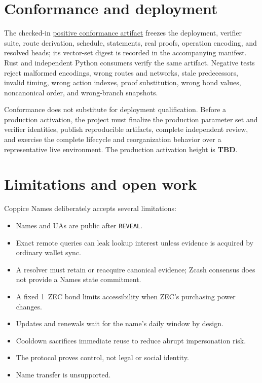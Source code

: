 \documentclass[11pt]{article}
\newcommand{\operation}[1]{\texttt{#1}}
\newcommand{\statusword}[1]{\textbf{#1}}
\begin{document}
\section{Conformance and deployment}
\label{sec:conformance}

The checked-in
\href{https://github.com/nfl0/coppice-names/blob/main/test-vectors/protocol.json}{positive
conformance artifact} freezes the deployment, verifier suite, route
derivation, schedule, statements, real proofs, operation encoding, and
resolved heads; its vector-set digest is recorded in the accompanying
manifest. Rust and independent Python consumers verify the same artifact.
Negative tests reject malformed encodings, wrong routes and networks, stale
predecessors, invalid timing, wrong action indexes, proof substitution, wrong
bond values, noncanonical order, and wrong-branch snapshots.

Conformance does not substitute for deployment qualification. Before a
production activation, the project must finalize the production parameter set
and verifier identities, publish reproducible artifacts, complete independent
review, and exercise the complete lifecycle and reorganization behavior over
a representative live environment. The production activation height is
\statusword{TBD}.

\section{Limitations and open work}
\label{sec:limitations}

Coppice Names deliberately accepts several limitations:

\begin{itemize}
\item Names and UAs are public after \operation{REVEAL}.
\item Exact remote queries can leak lookup interest unless evidence is
acquired by ordinary wallet sync.
\item A resolver must retain or reacquire canonical evidence; Zcash consensus
does not provide a Names state commitment.
\item A fixed 1~ZEC bond limits accessibility when ZEC's purchasing power
changes.
\item Updates and renewals wait for the name's daily window by design.
\item Cooldown sacrifices immediate reuse to reduce abrupt impersonation
risk.
\item The protocol proves control, not legal or social identity.
\item Name transfer is unsupported.
\end{itemize}
\end{document}
